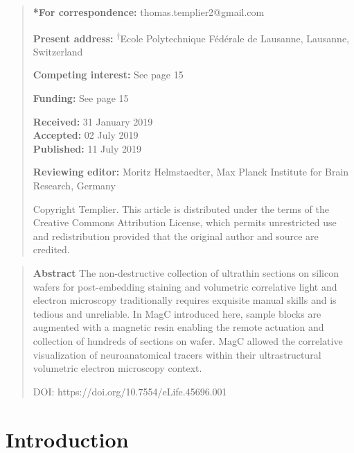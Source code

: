 \documentclass{article}
\begin{document}
\begin{quote}\small
\noindent \textbf{*For correspondence:} thomas.templier2@gmail.com

\noindent \textbf{Present address:} \textsuperscript{†}Ecole Polytechnique Fédérale de Lausanne, Lausanne, Switzerland

\noindent \textbf{Competing interest:} See page 15

\noindent \textbf{Funding:} See page 15

\noindent \textbf{Received:} 31 January 2019\\
\textbf{Accepted:} 02 July 2019\\
\textbf{Published:} 11 July 2019

\noindent \textbf{Reviewing editor:} Moritz Helmstaedter, Max Planck Institute for Brain Research, Germany

\noindent Copyright Templier. This article is distributed under the terms of the Creative Commons Attribution License, which permits unrestricted use and redistribution provided that the original author and source are credited.
\end{quote}

\begin{quote}
\noindent\textbf{Abstract} The non-destructive collection of ultrathin sections on silicon wafers for post-embedding staining and volumetric correlative light and electron microscopy traditionally requires exquisite manual skills and is tedious and unreliable. In MagC introduced here, sample blocks are augmented with a magnetic resin enabling the remote actuation and collection of hundreds of sections on wafer. MagC allowed the correlative visualization of neuroanatomical tracers within their ultrastructural volumetric electron microscopy context.

\noindent DOI: https://doi.org/10.7554/eLife.45696.001
\end{quote}

\section*{Introduction}
\end{document}
